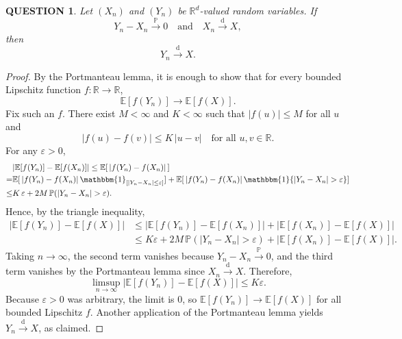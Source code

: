 \documentclass[12pt]{article}
\renewcommand{\(}{\left(}%
\renewcommand{\)}{\right)}%
\renewcommand{\[}{\left[}%
\renewcommand{\]}{\right]}%
\renewcommand{\r}{\mathbb{R}}
\newcommand{\p}{\mathbb{P}}
\newtheorem{question}{QUESTION}[section]}
\newtheorem{proof}{Proof.}}
\begin{document}
\begin{question}
Let $(X_n)$ and $(Y_n)$ be $\r^d$-valued random variables. If
\begin{equation*}
Y_n - X_n \xrightarrow{\p} 0
\quad\text{and}\quad
X_n \xrightarrow{\mathrm{d}} X,
\end{equation*}
then
\begin{equation*}
Y_n \xrightarrow{\mathrm{d}} X.
\end{equation*}
\end{question}

\begin{proof}
By the Portmanteau lemma, it is enough to show that for every bounded Lipschitz function $f:\mathbb{R}\to\mathbb{R}$,
\begin{equation*}
\mathbb{E}[f(Y_n)] \to \mathbb{E}[f(X)] .
\end{equation*}
Fix such an $f$. There exist $M<\infty$ and $K<\infty$ such that $|f(u)|\le M$ for all $u$ and
\begin{equation*}
|f(u)-f(v)| \le K\,|u-v| \quad\text{for all }u,v\in\mathbb{R}.
\end{equation*}
For any $\varepsilon>0$,
\begin{equation*}
\begin{aligned}
&|\mathbb{E}[f(Y_n)]-\mathbb{E}[f(X_n)]|
\le \mathbb{E}[\,|f(Y_n)-f(X_n)|\,] \\
=& \mathbb{E}[\,|f(Y_n)-f(X_n)|\,\mathbbm{1}_{[|Y_n-X_n|\le\varepsilon]}]
   + \mathbb{E}[\,|f(Y_n)-f(X_n)|\,\mathbbm{1}\{|Y_n-X_n|>\varepsilon\}] \\
\le& K\,\varepsilon + 2M\,\mathbb{P}(|Y_n-X_n|>\varepsilon).
\end{aligned}
\end{equation*}
Hence, by the triangle inequality,
\begin{equation*}
\begin{split}
	|\mathbb{E}[f(Y_n)]-\mathbb{E}[f(X)]|
&\le |\mathbb{E}[f(Y_n)]-\mathbb{E}[f(X_n)]|
 + |\mathbb{E}[f(X_n)]-\mathbb{E}[f(X)]|\\
&\le K\varepsilon + 2M\,\mathbb{P}(|Y_n-X_n|>\varepsilon) + |\mathbb{E}[f(X_n)]-\mathbb{E}[f(X)]|.
\end{split}
\end{equation*}
Taking $n\to\infty$, the second term vanishes because $Y_n-X_n\xrightarrow{\p}0$, and the third term vanishes by the Portmanteau lemma since $X_n\xrightarrow{\mathrm{d}}X$. Therefore,
\begin{equation*}
\limsup_{n\to\infty}\big|\mathbb{E}[f(Y_n)]-\mathbb{E}[f(X)]\big| \le K\varepsilon .
\end{equation*}
Because $\varepsilon>0$ was arbitrary, the limit is $0$, so $\mathbb{E}[f(Y_n)]\to\mathbb{E}[f(X)]$ for all bounded Lipschitz $f$. Another application of the Portmanteau lemma yields $Y_n\xrightarrow{\mathrm{d}}X$, as claimed.
\end{proof}
\end{document}
